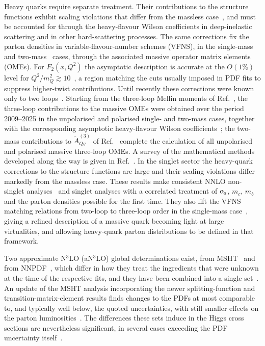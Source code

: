 Heavy quarks require separate treatment. Their contributions to the structure
functions exhibit scaling violations that differ from the massless
case~\cite{Blumlein:2016xcy}, and must be accounted for through the
heavy-flavour Wilson coefficients in deep-inelastic scattering and in other
hard-scattering processes. The same corrections fix the parton densities in
variable-flavour-number schemes (VFNS), in the single-mass~\cite{Buza:1996wv}
and two-mass~\cite{Ablinger:2017err} cases, through the associated massive
operator matrix elements (OMEs). For $F_2(x,Q^2)$ the asymptotic description is
accurate at the $O(1\%)$ level for $Q^2/m_Q^2\gtrsim10$~\cite{Buza:1995ie}, a
region matching the cuts usually imposed in PDF fits to suppress higher-twist
contributions. Until recently these corrections were known only to two
loops~\cite{Laenen:1992zk,Laenen:1992xs,Buza:1995ie,Buza:1996wv,
Bierenbaum:2007qe,Bierenbaum:2008yu,Bierenbaum:2009zt,Bierenbaum:2022biv}.
Starting from the three-loop Mellin moments of
Ref.~\cite{Bierenbaum:2009mv}, the three-loop contributions to the massive OMEs
were obtained over the period 2009--2025 in the unpolarised and polarised
single- and two-mass cases, together with the corresponding asymptotic
heavy-flavour Wilson coefficients~\cite{Ablinger:2010ty,Ablinger:2014vwa,
Ablinger:2014nga,Ablinger:2014lka,Behring:2014eya,Ablinger:2017err,
Ablinger:2018brx,Ablinger:2017xml,Ablinger:2022wbb,Ablinger:2023ahe,
Ablinger:2024xtt}; the two-mass contributions to
$\widetilde{A}_{Qg}^{(3)}$ of Ref.~\cite{Ablinger:2025nnq} complete the
calculation of all unpolarised and polarised massive three-loop OMEs. A survey
of the mathematical methods developed along the way is given in
Ref.~\cite{Blumlein:2023aso}. In the singlet sector the heavy-quark corrections
to the structure functions are large and their scaling violations differ
markedly from the massless case. These results make consistent NNLO non-singlet
analyses~\cite{Blumlein:2021lmf} and singlet analyses with a correlated
treatment of $\alpha_{\mathrm{s}}$, $m_c$, $m_b$ and the parton densities possible for the
first time. They also lift the VFNS matching relations from two-loop to
three-loop order in the single-mass case~\cite{Ablinger:2025joi}, giving a
refined description of a massive quark becoming light at large virtualities,
and allowing heavy-quark parton distributions to be defined in that framework.

Two approximate N$^3$LO (aN$^3$LO) global determinations exist, from
MSHT~\cite{McGowan:2022nag} and from NNPDF~\cite{NNPDF:2024nan}, which differ
in how they treat the ingredients that were unknown at the time of the
respective fits, and they have been combined into a single
set~\cite{Cridge:2024icl}. An update of the MSHT analysis incorporating the
newer splitting-function and transition-matrix-element results finds changes to
the PDFs at most comparable to, and typically well below, the quoted
uncertainties, with still smaller effects on the parton
luminosities~\cite{Cridge:2025oel}. The differences these sets induce in the
Higgs cross sections are nevertheless significant, in several cases exceeding
the PDF uncertainty itself~\cite{Cridge:2024icl}.


